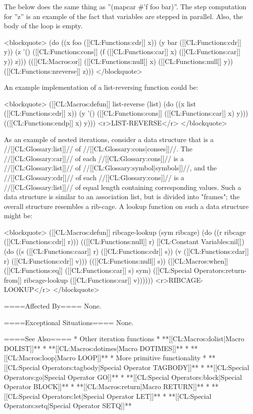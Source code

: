 The below does the same thing as ''(mapcar #'f foo bar)''. The step computation for ''z'' is an example of the fact that variables are stepped in parallel. Also, the body of the loop is empty.

<blockquote>
(do ((x foo ([[CL:Functions:cdr]] x))
     (y bar ([[CL:Functions:cdr]] y)) 
     (z '() ([[CL:Functions:cons]] (f ([[CL:Functions:car]] x) ([[CL:Functions:car]] y)) z)))
    (([[CL:Macros:or]] ([[CL:Functions:null]] x) ([[CL:Functions:null]] y))
     ([[CL:Functions:nreverse]] z)))
</blockquote> 

An example implementation of a list-reversing function could be:

<blockquote> 
([[CL:Macros:defun]] list-reverse (list) 
  (do ((x list ([[CL:Functions:cdr]] x)) 
       (y '() ([[CL:Functions:cons]] ([[CL:Functions:car]] x) y))) 
      (([[CL:Functions:endp]] x) y))) <r>LIST-REVERSE</r>
</blockquote>

As an example of nested iterations, consider a data structure that is a //[[CL:Glossary:list]]// of //[[CL:Glossary:cons|conses]]//. The //[[CL:Glossary:car]]// of each //[[CL:Glossary:cons]]// is a //[[CL:Glossary:list]]// of //[[CL:Glossary:symbol|symbols]]//, and the //[[CL:Glossary:cdr]]// of each //[[CL:Glossary:cons]]// is a //[[CL:Glossary:list]]// of equal length containing corresponding values. Such a data structure is similar to an association list, but is divided into "frames"; the overall structure resembles a rib-cage. A lookup function on such a data structure might be:

<blockquote>
([[CL:Macros:defun]] ribcage-lookup (sym ribcage)
  (do ((r ribcage ([[CL:Functions:cdr]] r))) 
      (([[CL:Functions:null]] r) [[CL:Constant Variables:nil]]) 
    (do ((s ([[CL:Functions:caar]] r) ([[CL:Functions:cdr]] s)) 
         (v ([[CL:Functions:cdar]] r) ([[CL:Functions:cdr]] v)))
        (([[CL:Functions:null]] s)) 
      ([[CL:Macros:when]] ([[CL:Functions:eq]] ([[CL:Functions:car]] s) sym)
        ([[CL:Special Operators:return-from]] ribcage-lookup ([[CL:Functions:car]] v)))))) <r>RIBCAGE-LOOKUP</r>
</blockquote>

====Affected By====
None.

====Exceptional Situations====
None.

====See Also====
  * Other iteration functions 
    * **[[CL:Macros:dolist|Macro DOLIST]]**
    * **[[CL:Macros:dotimes|Macro DOTIMES]]**
    * **[[CL:Macros:loop|Macro LOOP]]**
  * More primitive functionality 
    * **[[CL:Special Operators:tagbody|Special Operator TAGBODY]]**
    * **[[CL:Special Operators:go|Special Operator GO]]**
    * **[[CL:Special Operators:block|Special Operator BLOCK]]**
    * **[[CL:Macros:return|Macro RETURN]]**
    * **[[CL:Special Operators:let|Special Operator LET]]**
    * **[[CL:Special Operators:setq|Special Operator SETQ]]**

